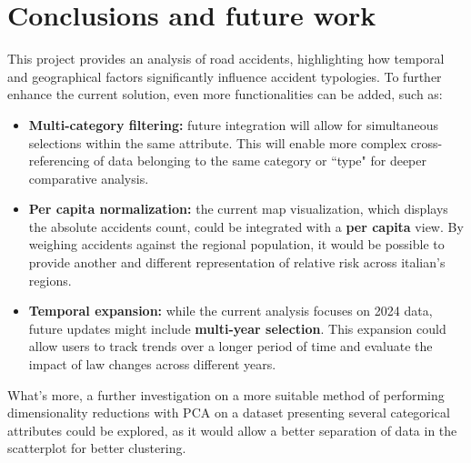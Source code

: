 \documentclass[12pt]{article}
\begin{document}
\section{Conclusions and future work}
This project provides an analysis of road accidents, highlighting how temporal and geographical factors significantly influence accident typologies. To further enhance the current solution, even more functionalities can be added, such as:

\begin{itemize}
    \item \textbf{Multi-category filtering:} future integration will allow for simultaneous selections within the same attribute. This will enable more complex cross-referencing of data belonging 
    to the same category or ``type" for deeper comparative analysis.
    \item \textbf{Per capita normalization:} the current map visualization, which displays the absolute accidents count, could be integrated with a \textbf{per capita} view.
    By weighing accidents against the regional population, it would be possible to provide another and different representation of relative risk across italian's regions.
    \item \textbf{Temporal expansion:} while the current analysis focuses on 2024 data, future updates might include \textbf{multi-year selection}. This expansion could allow users to track trends over a longer period of time and evaluate the impact of law changes across different years.
\end{itemize}
What's more, a further investigation on a more suitable method of performing dimensionality reductions with PCA on a dataset presenting several categorical attributes could be explored, as it would allow a better separation of data in the scatterplot for better clustering.
\newpage






\end{document}
